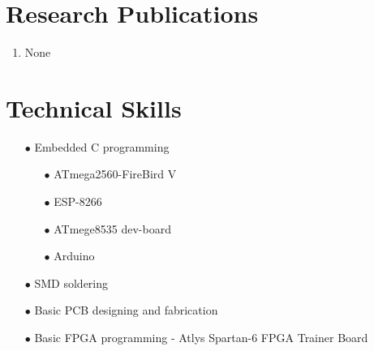 \documentclass{article}
\begin{document}
	\section*{Research Publications}
	\begin{enumerate}
		\item None
	\end{enumerate}

	\section*{Technical Skills}
		\begin{itemize}
			\item[$\bullet$] Embedded C programming
			\begin{itemize}
				\item[$\bullet$] ATmega2560-FireBird V
				\item[$\bullet$] ESP-8266
				\item[$\bullet$] ATmege8535 dev-board
				\item[$\bullet$] Arduino
			\end{itemize}
			\item[$\bullet$] SMD soldering
			\item[$\bullet$] Basic PCB designing and fabrication
			\item[$\bullet$] Basic FPGA programming - Atlys Spartan-6 FPGA Trainer Board
		\end{itemize}
	
\end{document}
